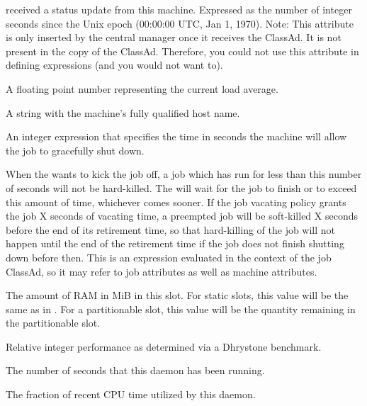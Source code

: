 \begin{description}
received a status update from this machine.  
Expressed as 
the number of integer seconds since the Unix epoch (00:00:00 UTC, Jan 1, 1970).
Note: This attribute is only inserted by the central manager once it
receives the ClassAd.
It is not present in the  copy of the ClassAd.
Therefore, you could not use this attribute in defining 
expressions (and you would not want to).
%
\item[\AdAttr{LoadAvg}:] A floating point number representing the 
current load average.
%
\item[\AdAttr{Machine}:] A string with the machine's fully qualified host name.
%
\item[\AdAttr{MachineMaxVacateTime}:] An integer expression that specifies
the time in seconds the machine will allow the job to gracefully shut
down.
%
\item[\AdAttr{MaxJobRetirementTime}:] When the  wants
to kick the job off, a job which has run for less than this number
of seconds will not be hard-killed.  The  will wait
for the job to finish or to exceed this amount of time, whichever
comes sooner.  If the job vacating policy grants the job X seconds
of vacating time, a preempted job will be soft-killed X seconds
before the end of its retirement time, so that hard-killing of the
job will not happen until the end of the retirement time if the job
does not finish shutting down before then.  This is an expression
evaluated in the context of the job ClassAd, so it may refer to job
attributes as well as machine attributes.
%
\item[\AdAttr{Memory}:] The amount of RAM in MiB in this slot.
For static slots, this value will be the same as in .
For a partitionable slot, this value will be the quantity remaining
in the partitionable slot.
%
\item[\AdAttr{Mips}:] Relative integer performance as determined via a Dhrystone
benchmark.

\item[\AdAttr{MonitorSelfAge}:] The number of seconds that this daemon
  has been running.

\item[\AdAttr{MonitorSelfCPUUsage}:] The fraction of recent CPU time utilized
  by this daemon. 


\end{description}
